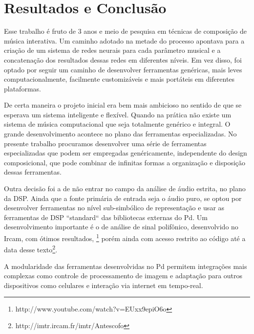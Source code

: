 \documentclass{ppgmus}
\begin{document}






\chapter{Resultados e Conclusão}
\label{sec:conclusao}




Esse trabalho é fruto de 3 anos e meio de pesquisa em técnicas
de composição de música interativa. Um caminho adotado na metade do
processo apontava para a criação de um sistema de redes neurais 
para cada parâmetro musical e a concatenação dos resultados dessas redes
em diferentes níveis. Em vez disso, foi optado por seguir um caminho
de desenvolver ferramentas genéricas, mais leves computacionalmente,
facilmente customizáveis e mais portáteis em diferentes plataformas.

De certa maneira o projeto inicial era bem mais ambicioso no sentido
de que se esperava um sistema inteligente e flexível. 
Quando na prática
não existe um sistema de música computacional que seja totalmente genérico
e integral. O grande desenvolvimento acontece no plano das ferramentas
especializadas. No presente trabalho procuramos desenvolver uma série
de ferramentas especializadas que podem ser empregadas genéricamente, independente
do design composicional, que pode combinar de infinitas formas a organização e 
disposição dessas ferramentas.  

Outra decisão foi a de não entrar no campo da análise de áudio estrita, no plano
da DSP. Ainda que a fonte primária de entrada seja o áudio puro, se optou por
desenvolver ferramentas no nível sub-simbólico de representação e usar as ferramentas
de DSP ``standard`` das bibliotecas externas do Pd. Um desenvolvimento importante
é o de análise de sinal polifônico, desenvolvido no Ircam, com ótimos resultados,
\footnote{http://www.youtube.com/watch?v=EUxx9epiO6o}
porém ainda com acesso restrito
ao código até a data desse texto\footnote{http://imtr.ircam.fr/imtr/Antescofo}.    


A modularidade das ferramentas desenvolvidas no Pd permitem
integrações mais complexas como controle de  processamento de imagem
e adaptação para outros dispositivos como celulares e interação via internet
em tempo-real.
\end{document}
